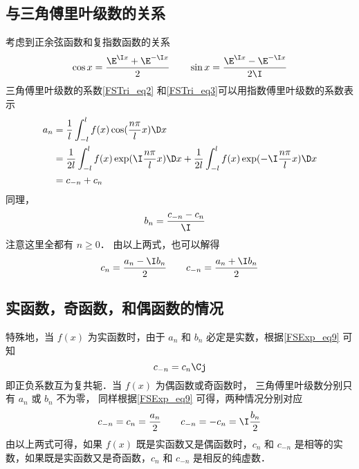 \subsection{与三角傅里叶级数的关系}
考虑到正余弦函数和复指数函数的关系
\begin{equation}
\cos x = \frac{\E^{\I x} + \E^{-\I x}}{2} \qquad
\sin x = \frac{\E^{\I x} - \E^{-\I x}}{2\I}
\end{equation}
三角傅里叶级数的系数\autoref{FSTri_eq2} 和\autoref{FSTri_eq3}可以用指数傅里叶级数的系数表示
\begin{equation}
\begin{aligned}
{a_n} &= \frac{1}{l}\int_{ - l}^l {f( x )\cos (\frac{n\pi }{l}x)\D x}\\
&=  \frac{1}{2l}\int_{ - l}^l {f( x )\exp(\I\frac{n\pi }{l}x) \D x} + \frac{1}{2l}\int_{ - l}^l {f( x )\exp(-\I\frac{n\pi}{l}x) \D x} \\
&= {c_{-n} + c_n}
\end{aligned}\end{equation}
同理，
\begin{equation}
\begin{aligned}
{b_n} &= \frac{c_{-n}-c_n}{\I}
\end{aligned}\end{equation}
注意这里全都有 $n\ge 0$． 由以上两式，也可以解得
\begin{equation}\label{FSExp_eq9}
c_n = \frac{a_n - \I b_n}{2} \qquad
c_{-n} = \frac{a_n + \I b_n}{2}
\end{equation}

\subsection{实函数，奇函数，和偶函数的情况}
特殊地，当 $f(x)$ 为实函数时，由于 $a_n$ 和 $b_n$ 必定是实数，根据\autoref{FSExp_eq9} 可知
\begin{equation}
c_{-n} = c_{n}\Cj
\end{equation}
即正负系数互为复共轭．当 $f(x)$ 为偶函数或奇函数时， 三角傅里叶级数分别只有 $a_n$ 或 $b_n$ 不为零， 同样根据\autoref{FSExp_eq9} 可得，两种情况分别对应
\begin{equation}
c_{-n} = c_n =\frac{a_n}{2} \qquad
c_{-n} = -c_n = \I \frac{b_n}{2}
\end{equation}
由以上两式可得，如果 $f(x)$ 既是实函数又是偶函数时，$c_n$ 和 $c_{-n}$ 是相等的实数，如果既是实函数又是奇函数，$c_n$ 和 $c_{-n}$ 是相反的纯虚数．


































